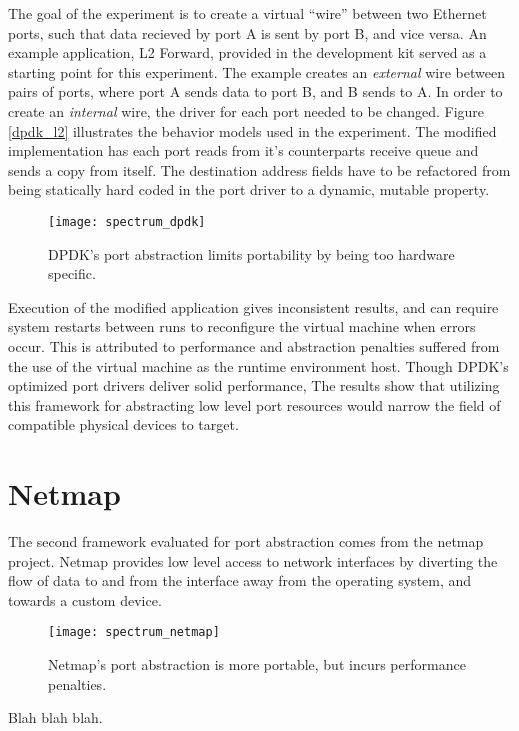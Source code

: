 The goal of the experiment is to create a virtual ``wire'' between two Ethernet
ports, such that data recieved by port A is sent by port B, and vice versa. An
example application, L2 Forward, provided in the development kit served as a
starting point for this experiment. The example creates an \emph{external}
wire between pairs of ports, where port A sends data to port B, and B sends to
A. In order to create an \emph{internal} wire, the driver for each port needed
to be changed. Figure \ref{dpdk_l2} illustrates the behavior models used in the
experiment. The modified implementation has each port reads from it's
counterparts receive queue and sends a copy from itself.  The destination
address fields have to be refactored from being statically hard coded in the
port driver to a dynamic, mutable property.

\begin{figure}[h]
  \centering
  \texttt{[image: spectrum\_dpdk]}
  \caption{DPDK's port abstraction limits portability by being too hardware
  specific.}
  \label{hardware:spectrum_dpdk}
\end{figure}

Execution of the modified application gives inconsistent results, and can
require system restarts between runs to reconfigure the virtual machine when
errors occur. This is attributed to performance and abstraction penalties
suffered from the use of the virtual machine as the runtime environment host.
Though DPDK's optimized port drivers deliver solid performance,
The results show that utilizing this framework for abstracting low level port
resources would narrow the field of compatible physical devices to target.

\section{Netmap}
\label{hardware:netmap}
The second framework evaluated for port abstraction comes from the netmap
project. Netmap provides low level access to network interfaces by diverting
the flow of data to and from the interface away from the operating system, and
towards a custom device.

\begin{figure}[h]
  \centering
  \texttt{[image: spectrum\_netmap]}
  \caption{Netmap's port abstraction is more portable, but incurs performance
  penalties.}
  \label{hardware:spectrum_netmap}
\end{figure}

Blah blah blah.

